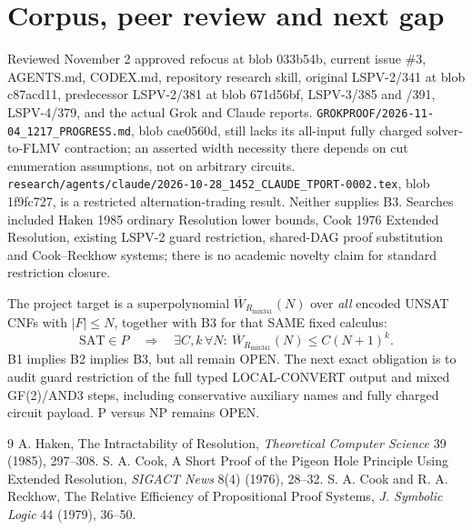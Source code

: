 \documentclass[11pt]{article}
\begin{document}
\section*{Corpus, peer review and next gap}
Reviewed November 2 approved refocus at blob 033b54b, current issue \#3, AGENTS.md, CODEX.md, repository research skill, original LSPV-2/341 at blob c87acd11, predecessor LSPV-2/381 at blob 671d56bf, LSPV-3/385 and /391, LSPV-4/379, and the actual Grok and Claude reports. \texttt{GROKPROOF/2026-11-04\_1217\_PROGRESS.md}, blob cae0560d, still lacks its all-input fully charged solver-to-FLMV contraction; an asserted width necessity there depends on cut enumeration assumptions, not on arbitrary circuits. \texttt{research/agents/claude/2026-10-28\_1452\_CLAUDE\_TPORT-0002.tex}, blob 1f9fc727, is a restricted alternation-trading result. Neither supplies B3. Searches included Haken 1985 ordinary Resolution lower bounds, Cook 1976 Extended Resolution, existing LSPV-2 guard restriction, shared-DAG proof substitution and Cook--Reckhow systems; there is no academic novelty claim for standard restriction closure.

The project target is a superpolynomial \(\overline W_{R_{\mathrm{mix341}}}(N)\) over \emph{all} encoded UNSAT CNFs with \(|F|\le N\), together with B3 for that SAME fixed calculus:
\[
\mathrm{SAT}\in P\quad\Longrightarrow\quad
\exists C,k\,\forall N:\ \overline W_{R_{\mathrm{mix341}}}(N)\le C(N+1)^k .
\]
B1 implies B2 implies B3, but all remain OPEN. The next exact obligation is to audit guard restriction of the full typed LOCAL-CONVERT output and mixed GF(2)/AND3 steps, including conservative auxiliary names and fully charged circuit payload. P versus NP remains OPEN.
\begin{thebibliography}{9}
 A. Haken, The Intractability of Resolution, \emph{Theoretical Computer Science} 39 (1985), 297--308.
 S. A. Cook, A Short Proof of the Pigeon Hole Principle Using Extended Resolution, \emph{SIGACT News} 8(4) (1976), 28--32.
 S. A. Cook and R. A. Reckhow, The Relative Efficiency of Propositional Proof Systems, \emph{J. Symbolic Logic} 44 (1979), 36--50.
\end{thebibliography}
\end{document}

